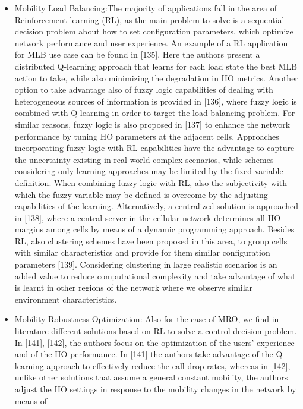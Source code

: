 \documentclass[12pt]{article}
\begin{document}
\begin{itemize}
	\item Mobility Load Balancing:The majority of applications fall in the area of Reinforcement learning (RL), as the main problem to solve is a sequential decision problem
	about how to set configuration parameters, which optimize
	network performance and user experience. 
	An example of a
	RL application for MLB use case can be found in [135].
	Here the authors present a distributed Q-learning approach
	that learns for each load state the best MLB action to take,
	while also minimizing the degradation in HO metrics. Another
	option to take advantage also of fuzzy logic capabilities of
	dealing with heterogeneous sources of information is provided
	in [136], where fuzzy logic is combined with Q-learning in
	order to target the load balancing problem. For similar reasons,
	fuzzy logic is also proposed in [137] to enhance the network
	performance by tuning HO parameters at the adjacent cells.
	Approaches incorporating fuzzy logic with RL capabilities
	have the advantage to capture the uncertainty existing in real
	world complex scenarios, while schemes considering only
	learning approaches may be limited by the fixed variable
	definition. When combining fuzzy logic with RL, also the
	subjectivity with which the fuzzy variable may be defined
	is overcome by the adjusting capabilities of the learning.
	Alternatively, a centralized solution is approached in [138],
	where a central server in the cellular network determines all
	HO margins among cells by means of a dynamic programming
	approach. Besides RL, also clustering schemes have been
	proposed in this area, to group cells with similar characteristics
	and provide for them similar configuration parameters [139].
	Considering clustering in large realistic scenarios is an added
	value to reduce computational complexity and take advantage
	of what is learnt in other regions of the network where we
	observe similar environment characteristics.
	\item Mobility Robustness Optimization: Also for the case of
	MRO, we find in literature different solutions based on RL to
	solve a control decision problem. In [141], [142], the authors
	focus on the optimization of the users’ experience and of
	the HO performance. In [141] the authors take advantage of
	the Q-learning approach to effectively reduce the call drop
	rates, whereas in [142], unlike other solutions that assume a
	general constant mobility, the authors adjust the HO settings in
	response to the mobility changes in the network by means of

\end{itemize}
\end{document}
